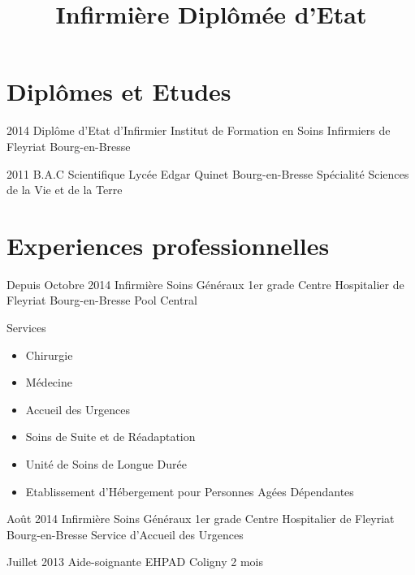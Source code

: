 \documentclass[10pt,a4paper]{moderncv}
\title{Infirmière Diplômée d'Etat}
\begin{document}
\maketitle
\pagestyle{empty}


\section{Diplômes et Etudes}

\cventry
	{2014}
	{Diplôme d'Etat d'Infirmier}
	{Institut de Formation en Soins Infirmiers de Fleyriat}
	{Bourg-en-Bresse}
	{}
	{}

\cventry
	{2011}
	{B.A.C Scientifique}
	{Lycée Edgar Quinet}
	{Bourg-en-Bresse}
	{}
	{Spécialité Sciences de la Vie et de la Terre}



\section{Experiences professionnelles}

\cventry
	{Depuis Octobre 2014}
	{Infirmière Soins Généraux 1er grade}
	{Centre Hospitalier de Fleyriat}
	{Bourg-en-Bresse}
	{}
	{Pool Central}

\cventry
	{}
	{Services}
	{}
	{}
	{}
	{
		\begin{itemize}
			\item Chirurgie
			\item Médecine
			\item Accueil des Urgences
			\item Soins de Suite et de Réadaptation
			\item Unité de Soins de Longue Durée
			\item Etablissement d'Hébergement pour Personnes Agées Dépendantes
		\end{itemize}
	}

\cventry
	{Août 2014}
	{Infirmière Soins Généraux 1er grade}
	{Centre Hospitalier de Fleyriat}
	{Bourg-en-Bresse}
	{}
	{Service d'Accueil des Urgences}

\cventry
	{Juillet 2013}
	{Aide-soignante}
	{EHPAD}
	{Coligny}
	{}
	{2 mois}
\end{document}
